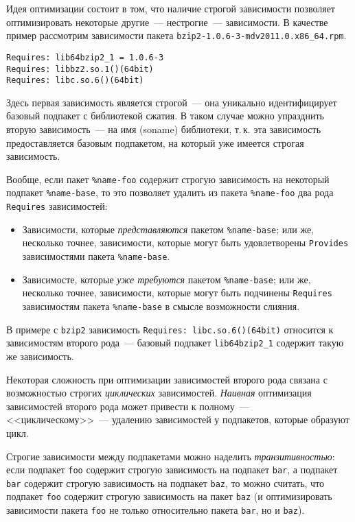 \documentclass[russian,a4paper,12pt,titlepage]{article}
\begin{document}
Идея оптимизации состоит в том, что наличие строгой зависимости позволяет
оптимизировать некоторые другие~--- нестрогие~--- зависимости.  В качестве пример
рассмотрим зависимости пакета \verb|bzip2-1.0.6-3-mdv2011.0.x86_64.rpm|.
\begin{verbatim}
Requires: lib64bzip2_1 = 1.0.6-3
Requires: libbz2.so.1()(64bit)
Requires: libc.so.6()(64bit)
\end{verbatim}
Здесь первая зависимость является строгой~--- она уникально идентифицирует базовый подпакет с библиотекой сжатия.
В таком случае можно упразднить вторую зависимость~--- на имя (soname) библиотеки, т.\,к. эта зависимость предоставляется
базовым подпакетом, на который уже имеется строгая зависимость.

Вообще, если пакет \verb|%name-foo| содержит строгую зависимость на некоторый подпакет \verb|%name-base|,
то это позволяет удалить из пакета \verb|%name-foo| два рода \verb|Requires| зависимостей:
\begin{itemize}
\item Зависимости, которые \textit{представляются} пакетом \verb|%name-base|; или же, несколько точнее,
зависимости, которые могут быть удовлетворены \verb|Provides| зависимостями пакета \verb|%name-base|.
\item Зависимосте, которые \textit{уже требуются} пакетом \verb|%name-base|; или же, несколько точнее,
зависимости, которые могут быть подчинены \verb|Requires| зависимостям пакета \verb|%name-base|
в смысле возможности слияния.
\end{itemize}
В примере с \verb|bzip2| зависимость \verb|Requires: libc.so.6()(64bit)| относится к зависимостям второго рода~---
базовый подпакет \verb|lib64bzip2_1| содержит такую же зависимость.

Некоторая сложность при оптимизации зависимостей второго рода связана с возможностью строгих \textit{циклических}
зависимостей.  \textit{Наивная} оптимизация зависимостей второго рода может привести к полному~--- <<циклическому>>~---
удалению зависимостей у подпакетов, которые образуют цикл.

Строгие зависимости между подпакетами можно наделить \textit{транзитивностью}: если подпакет \verb|foo| содержит
строгую зависимость на подпакет \verb|bar|, а подпакет \verb|bar| содержит строгую зависимость на подпакет \verb|baz|,
то можно считать, что подпакет \verb|foo| содержит строгую зависимость на пакет \verb|baz| (и оптимизировать зависимости
пакета \verb|foo| не только относительно пакета \verb|bar|, но и \verb|baz|).
\end{document}
